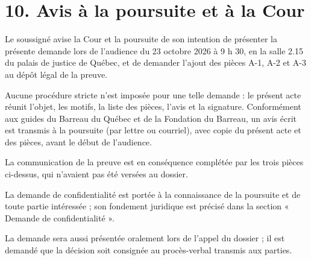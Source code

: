 \documentclass[12pt,a4paper]{article}
\begin{document}
\section*{10. Avis à la poursuite et à la Cour}
Le soussigné avise la Cour et la poursuite de son intention de présenter la présente demande lors de l’audience du 23 octobre 2026 à 9 h 30, en la salle 2.15 du palais de justice de Québec, et de demander l’ajout des pièces A-1, A-2 et A-3 au dépôt légal de la preuve.

Aucune procédure stricte n’est imposée pour une telle demande : le présent acte réunit l’objet, les motifs, la liste des pièces, l’avis et la signature. Conformément aux guides du Barreau du Québec et de la Fondation du Barreau, un avis écrit est transmis à la poursuite (par lettre ou courriel), avec copie du présent acte et des pièces, avant le début de l’audience.

La communication de la preuve est en conséquence complétée par les trois pièces ci-dessus, qui n’avaient pas été versées au dossier.

La demande de confidentialité est portée à la connaissance de la poursuite et de toute partie intéressée ; son fondement juridique est précisé dans la section « Demande de confidentialité ».

La demande sera aussi présentée oralement lors de l’appel du dossier ; il est demandé que la décision soit consignée au procès-verbal transmis aux parties.
\end{document}
